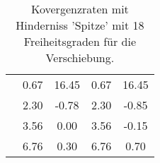 \begin{table}
\begin{tabular}{c|cc|cc|}
\multicolumn{1}{|c|}{} & \multicolumn{1}{|c|}{      0.67} & \multicolumn{1}{|c|}{     16.45} & \multicolumn{1}{|c|}{      0.67} & \multicolumn{1}{|c|}{     16.45} \\ 
\multicolumn{1}{|c|}{} & \multicolumn{1}{|c|}{      2.30} & \multicolumn{1}{|c|}{     -0.78} & \multicolumn{1}{|c|}{      2.30} & \multicolumn{1}{|c|}{     -0.85} \\ 
\multicolumn{1}{|c|}{} & \multicolumn{1}{|c|}{      3.56} & \multicolumn{1}{|c|}{      0.00} & \multicolumn{1}{|c|}{      3.56} & \multicolumn{1}{|c|}{     -0.15} \\ 
\multicolumn{1}{|c|}{} & \multicolumn{1}{|c|}{      6.76} & \multicolumn{1}{|c|}{      0.30} & \multicolumn{1}{|c|}{      6.76} & \multicolumn{1}{|c|}{      0.70} \\ 
\hline 
\end{tabular}\caption{Kovergenzraten mit Hinderniss 'Spitze' mit 18 Freiheitsgraden für die Verschiebung.}\label{tab:Rate_Spitze_level0}
\end{table} 
